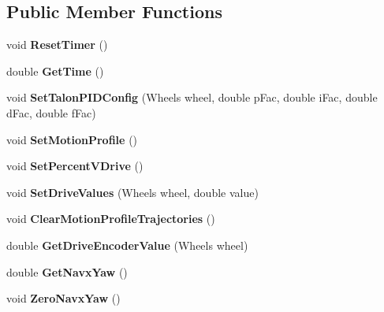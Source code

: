 \subsection*{Public Member Functions}
\begin{DoxyCompactItemize}
\item 
\mbox{\label{class_robot_model_a12fcf976a7f338c4d7dcba8b2765bbca}} 
void {\bfseries Reset\+Timer} ()
\item 
\mbox{\label{class_robot_model_a53211a6f086c2934f29696097e33c13c}} 
double {\bfseries Get\+Time} ()
\item 
\mbox{\label{class_robot_model_a5c46e71b1ecd43497fa6a552edee2850}} 
void {\bfseries Set\+Talon\+P\+I\+D\+Config} (Wheels wheel, double p\+Fac, double i\+Fac, double d\+Fac, double f\+Fac)
\item 
\mbox{\label{class_robot_model_a9e82ace9c9249288fd82b58a6ec1288e}} 
void {\bfseries Set\+Motion\+Profile} ()
\item 
\mbox{\label{class_robot_model_a00aec98c4ed4de1e7f48c2482fdad2a1}} 
void {\bfseries Set\+Percent\+V\+Drive} ()
\item 
\mbox{\label{class_robot_model_a98f996b588768ca75ca0cf2dddcd217c}} 
void {\bfseries Set\+Drive\+Values} (Wheels wheel, double value)
\item 
\mbox{\label{class_robot_model_ac34a7071a6f8e1cccc5b16acd966d512}} 
void {\bfseries Clear\+Motion\+Profile\+Trajectories} ()
\item 
\mbox{\label{class_robot_model_a79245b48351252c90a9ff994e9b40ebb}} 
double {\bfseries Get\+Drive\+Encoder\+Value} (Wheels wheel)
\item 
\mbox{\label{class_robot_model_a48702daa83b141eb0dd1dc6f0fd75c35}} 
double {\bfseries Get\+Navx\+Yaw} ()
\item 
\mbox{\label{class_robot_model_a49cf4f33221954e0efbfc14dae477595}} 
void {\bfseries Zero\+Navx\+Yaw} ()
\end{DoxyCompactItemize}

